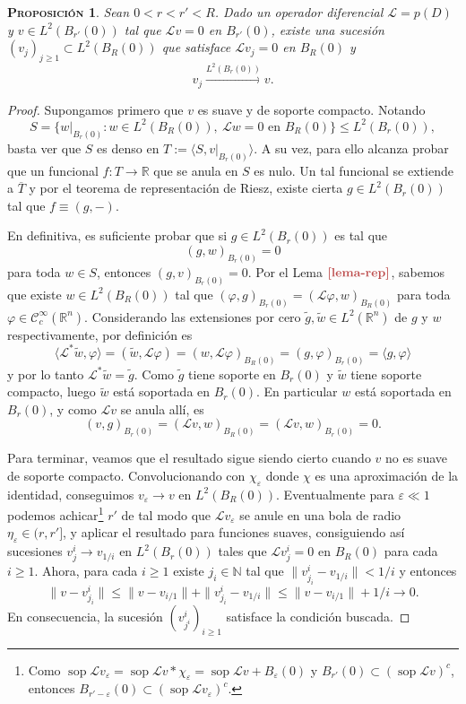 \documentclass[11pt]{article}
\theoremstyle{colored}
\DeclareMathOperator{\sop}{sop}
\newtheorem{proposition}{\scshape Proposición}
\newcommand{\N}{\mathbb{N}}
\newcommand{\R}{\mathbb{R}}
\newcommand{\C}{\mathscr{C}}
\newcommand{\eps}{\varepsilon}
\newcommand{\ev}[1]{\langle #1 \rangle}
\newcommand{\ip}[1]{( #1 )}
\renewcommand{\L}{\mathscr{L}}
\newcommand{\paint}[1]{\color{color}{#1}}
\newcommand{\tpaint}[1]{\paint{\textbf{#1}}}
\begin{document}
\begin{proposition} \label{aprox} Sean $0 < r < r' < R$. Dado un operador diferencial $\L = p(D)$ y $v \in L^2(B_{r'}(0))$ tal que $\L v = 0$ en $B_{r'}(0)$, existe una sucesión $(v_j)_{j \geq 1} \subset L^2(B_R(0))$ que satisface $\L v_j = 0$ en $B_R(0)$ y 
\[
v_j \xrightarrow{L^2(B_r(0))} v.
\]
\end{proposition}
\begin{proof} Supongamos primero que $v$ es suave y de soporte compacto. Notando
\[
S = \{ w|_{B_r(0)} : w \in L^2(B_R(0)), \ \L w = 0 \text{ en } B_R(0)\} \leq L^2(B_r(0)),
\]
basta ver que $S$ es denso en $T := \langle S, v|_{B_r(0)} \rangle$. A su vez, para ello alcanza probar que un funcional $f : T \to \R$ que se anula en $S$ es nulo. Un tal funcional se extiende a $\overline{T}$ y por el teorema de representación de Riesz, existe cierta $g \in L^2(B_r(0))$ tal que $f \equiv (g,-)$. 

En definitiva, es suficiente probar que si $g \in L^2(B_r(0))$ es tal que 
\[
\ip{g,w}_{B_r(0)} = 0
\]
para toda $w \in S$, entonces $\ip{g,v}_{B_r(0)} = 0$. Por el Lema $\tpaint{\ref{lema-rep}}$, sabemos que existe  $w \in L^2(B_R(0))$ tal que $(\varphi,g)_{B_r(0)} = (\L \varphi, w)_{B_R(0)}$ para toda $\varphi \in \C_c^\infty(\R^n)$. Considerando las extensiones por cero $\widetilde{g},\widetilde{w} \in L^2(\R^n)$ de $g$ y $w$ respectivamente, por definición es
\[
\ev{\L^\ast \widetilde{w},\varphi} = (\widetilde{w},\L \varphi) = (w,\L \varphi)_{B_R(0)} = (g,\varphi)_{B_r(0)} = \ev{ g, \varphi}
\]
y por lo tanto $\L^\ast \widetilde{w} = \widetilde{g}$. Como $\widetilde{g}$ tiene soporte en $B_r(0)$ y $\widetilde{w}$ tiene soporte compacto, luego $\widetilde{w}$ está soportada en $B_r(0)$. En particular $w$ está soportada en $B_r(0)$, y como $\L v$ se anula allí, es 
\[
(v,g)_{B_r(0)} = (\L v, w)_{B_R(0)} = (\L v, w)_{B_r(0)} = 0.
\]

Para terminar, veamos que el resultado sigue siendo cierto cuando $v$ no es suave de soporte compacto. Convolucionando con $\chi_\eps$ donde $\chi$ es una aproximación de la identidad, conseguimos $v_\eps \to v$ en $L^2(B_R(0))$. Eventualmente para $\eps \ll 1$ podemos achicar\footnote{Como $\sop \L v_\eps = \sop \L v \ast \chi_\eps = \sop \L v + B_\eps(0)$ y $B_{r'}(0) \subset (\sop \L v)^c$, entonces $B_{r'-\eps}(0) \subset (\sop \L v_\eps)^ c$.} $r'$ de tal modo que $\L v_\eps$ se anule en una bola de radio $\eta_\eps \in (r,r']$, y aplicar el resultado para funciones suaves, consiguiendo así sucesiones $v_{j}^i \to v_{1/i}$ en $L^2(B_r(0))$ tales que $\L v_j^i = 0$ en $B_R(0)$ para cada $i \geq 1$. Ahora, para cada $i \geq 1$ existe $j_i \in \N$ tal que $\|v_{j_i}^i - v_{1/i}\| < 1/i$ y entonces
\[
\|v - v_{j_i}^i\| \leq \|v-v_{i/1}\| + \|v_{j_i}^i - v_{1/i}\| \leq \|v-v_{i/1}\| + 1/i \to 0.
\]
En consecuencia, la sucesión $(v_{j^i}^i)_{i \geq 1}$ satisface la condición buscada.
\end{proof}
\end{document}
